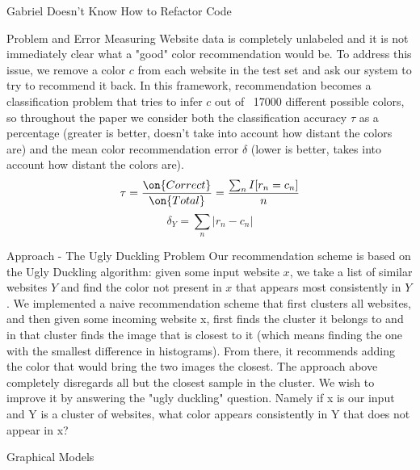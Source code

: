 \documentclass{beamer}
\newcommand{\N}{\mathcal{N}}
\begin{document}
\begin{frame}{\centerline{\Huge Gabriel Doesn't Know How to Refactor Code}}
\begin{textblock}{5}
\begin{block}{Problem and Error Measuring}
Website data is completely unlabeled and it is not immediately clear what a "good" color recommendation would be. To address this issue, we remove a color $c$ from each website in the test set and ask our system to try to recommend it back. In this framework, recommendation becomes a classification problem that tries to infer $c$ out of ~17000 different possible colors, so throughout the paper we consider both the classification accuracy $\tau$ as a percentage (greater is better, doesn't take into account how distant the colors are) and the mean color recommendation error $\delta$ (lower is better, takes into account how distant the colors are).
$$\tau = \frac{\on{Correct}}{\on{Total}} = \frac{\sum_n I[r_n = c_n]}{n}$$
$$\delta_Y = \sum_n |r_n - c_n|$$
\end{block}


\begin{block}{Approach - The Ugly Duckling Problem}
Our recommendation scheme is based on the Ugly Duckling algorithm: given some input website $x$, we take a list of similar websites $Y$ and find the color not present in $x$ that appears most consistently in $Y$.
We implemented a naive recommendation scheme that first clusters all websites, and then
given some incoming website x, first finds the cluster it belongs to and in that cluster finds the
image that is closest to it (which means finding the one with the smallest difference in
histograms). From there, it recommends adding the color that would bring the two images the
closest.
The approach above completely disregards all but the closest sample in the cluster. We wish to
improve it by answering the "ugly duckling" question. Namely if x is our input and Y is a cluster
of websites, what color appears consistently in Y that does not appear in x?
\end{block}

\begin{block}{Graphical Models}
\begin{figure}
\centering
{}
\end{figure}
\end{block}



\end{textblock}
\end{frame}
\end{document}
